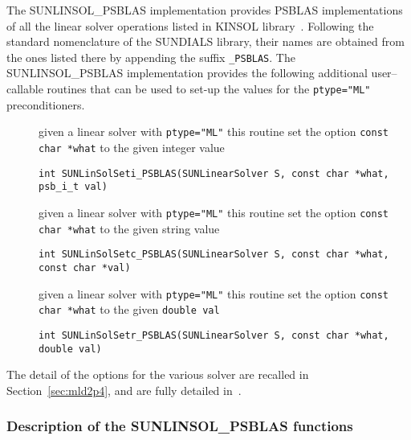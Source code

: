 \documentclass[twoside,a4paper]{refart}
\theoremstyle{definition}
\begin{document}
The SUNLINSOL\_PSBLAS implementation provides PSBLAS implementations of all the linear solver operations listed in KINSOL library~\cite[Section~8.1.1]{kinsolguide}. Following the standard nomenclature of the SUNDIALS library, their names are obtained from the ones listed there by appending the suffix \texttt{\_PSBLAS}. The SUNLINSOL\_PSBLAS implementation provides the following additional user--callable routines that can be used to set-up the values for the \lstinline[style=CStyle]|ptype="ML"| preconditioners.

\begin{description}
\item[] given a linear solver with \lstinline[style=CStyle]|ptype="ML"| this routine set the option \lstinline[style=CStyle]|const char *what| to the given integer value

 \lstinline[style=CStyle]|int SUNLinSolSeti_PSBLAS(SUNLinearSolver S, const char *what, psb_i_t val)|

\item[] given a linear solver with \lstinline[style=CStyle]|ptype="ML"| this routine set the option \lstinline[style=CStyle]|const char *what| to the given string value

 \lstinline[style=CStyle]|int SUNLinSolSetc_PSBLAS(SUNLinearSolver S, const char *what, const char *val)|

\item[] given a linear solver with \lstinline[style=CStyle]|ptype="ML"| this routine set the option \lstinline[style=CStyle]|const char *what| to the given \lstinline[style=CStyle]|double val|

 \lstinline[style=CStyle]|int SUNLinSolSetr_PSBLAS(SUNLinearSolver S, const char *what, double val)|
\end{description}

The detail of the options for the various solver are recalled in Section~\ref{sec:mld2p4}, and are fully detailed in~\cite{mld2p4guide}.

\subsubsection{Description of the SUNLINSOL\_PSBLAS functions}
\end{document}
